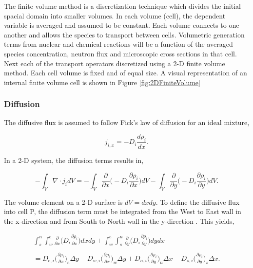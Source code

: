 The finite volume method is a discretization technique which divides the initial spacial domain into smaller volumes. In each volume (cell), the dependent variable is averaged and assumed to be constant. Each volume connects to one another and allows the species to transport between cells. Volumetric generation terms from nuclear and chemical reactions will be a function of the averaged species concentration, neutron flux and microscopic cross sections in that cell. Next each of the transport operators discretized using a 2-D finite volume method. Each cell volume is fixed and of equal size. A visual representation of an internal finite volume cell is shown in Figure \ref{fig:2DFiniteVolume}


 
\subsubsection{Diffusion}
The diffusive flux is assumed to follow Fick's law of diffusion for an ideal mixture,

\begin{equation}
    j_{i,x} = -D_{i}\frac{d\rho_{i}}{dx}.
\end{equation}

\noindent In a 2-D system, the diffusion terms results in,

\begin{equation}
    -\int_{V}\nabla \cdot j_{i}dV = -\int_{V}\frac{\partial }{\partial x}\bigg( -D_{i}\frac{\partial \rho_{i}}{\partial x}\bigg)dV - \int_{V}\frac{\partial }{\partial y}\bigg( -D_{i}\frac{\partial \rho_{i}}{\partial y}\bigg)dV.
\end{equation}

\noindent The volume element on a 2-D surface is $dV = dxdy$. To define the diffusive flux into cell P, the diffusion term must be integrated from the West to East wall in the x-direction and from South to North wall in the y-direction \cite{versteeg2007}. This yields,

\begin{equation}
\begin{split}
    \int_{s}^{n}\int_{w}^{e}\frac{\partial }{\partial x}\bigg( D_{i}\frac{\partial \rho_{i}}{\partial x}\bigg)dxdy + \int_{w}^{e}\int_{s}^{n}\frac{\partial }{\partial y}\bigg( D_{i}\frac{\partial \rho_{i}}{\partial y}\bigg)dydx \\ 
    \\
    = D_{e,i}\bigg(\frac{\partial \rho_{i}}{\partial x}\bigg)_{e}\Delta y -D_{w,i}\bigg(\frac{\partial \rho_{i}}{\partial x}\bigg)_{w}\Delta y
    + D_{n,i}\bigg(\frac{\partial \rho_{i}}{\partial y}\bigg)_{n}\Delta x - D_{s,i}\bigg(\frac{\partial \rho_{i}}{\partial y}\bigg)_{s}\Delta x.
\end{split}
\end{equation}

